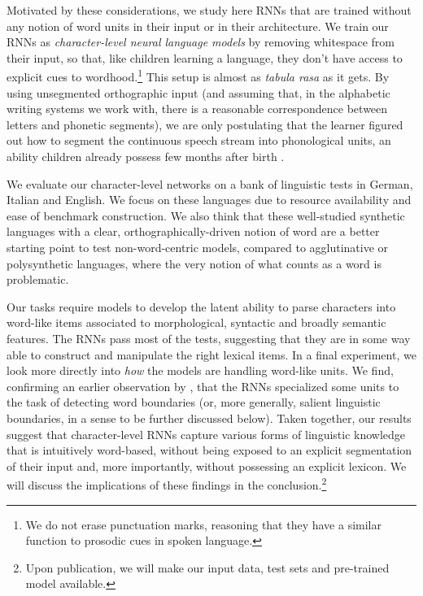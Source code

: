 Motivated by these considerations, we study here RNNs that are trained
without any notion of word units in their input or in their
architecture. We train our RNNs as \emph{character-level neural
  language models}
\cite[CNLMs,][]{Mikolov:etal:2011,Sutskever:etal:2011,DBLP:journals/corr/Graves13}
by removing whitespace from their input, so that, like children
learning a language, they don't have access to explicit cues to
wordhood.\footnote{We do not erase punctuation marks, reasoning that
  they have a similar function to prosodic cues in spoken language.}
This setup is almost as \emph{tabula rasa} as it gets. By using
unsegmented orthographic input (and assuming that, in the alphabetic
writing systems we work with, there is a reasonable correspondence
between letters and phonetic segments), we are only postulating that
the learner figured out how to segment the continuous speech stream
into phonological units, an ability children already possess few
months after birth \cite[e.g.,][]{Maye:etal:2002,Kuhl:2004}.

We evaluate our character-level networks on a bank of linguistic tests
in German, Italian and English. We focus on these languages due to
resource availability and ease of benchmark construction. We also
think that these well-studied synthetic languages with a clear,
orthographically-driven notion of word are a better starting point to
test non-word-centric models, compared to agglutinative or
polysynthetic languages, where the very notion of what counts as a
word is problematic. %
  
Our tasks require models to develop the latent
ability to parse characters into word-like items associated to
morphological, syntactic and broadly semantic features. The RNNs
pass most of the tests, suggesting that they are in some way able to
construct and manipulate the right lexical items. In a final experiment,
we look more directly into \emph{how} the models are handling
word-like units. We find, confirming an earlier observation by
, that the RNNs specialized some
units to the task of detecting word boundaries (or, more generally,
salient linguistic boundaries, in a sense to be further discussed
below). Taken together, our results suggest that character-level RNNs
capture various forms of linguistic knowledge that is intuitively
word-based, without being exposed to an explicit segmentation of their
 input and, more importantly, without possessing an explicit
lexicon. We will discuss the implications of these findings in the
conclusion.\footnote{Upon publication, we will make our input data,
  test sets and pre-trained model available.}


